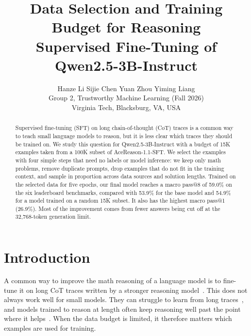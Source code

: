 \documentclass{article}
\title{Data Selection and Training Budget for Reasoning\\Supervised Fine-Tuning of Qwen2.5-3B-Instruct}
\author{%
  Hanze Li \quad Sijie Chen \quad Yuan Zhou \quad Yiming Liang \\
  Group 2, Trustworthy Machine Learning (Fall 2026) \\
  Virginia Tech, Blacksburg, VA, USA
}
\makeatletter
\newcommand{\passk}[1]{pass@#1}
\makeatother
\begin{document}
\maketitle

\begin{abstract}
Supervised fine-tuning (SFT) on long chain-of-thought (CoT) traces is a common way to teach small language models to reason,
but it is less clear which traces they should be trained on. We study this question for Qwen2.5-3B-Instruct with a budget of
15K examples taken from a 100K subset of AceReason-1.1-SFT. We select the examples with four simple steps that need no labels
or model inference: we keep only math problems, remove duplicate prompts, drop examples that do not fit in the training
context, and sample in proportion across data sources and solution lengths. Trained on the selected data for five epochs, our
final model reaches a macro \passk{8} of 59.0\% on the six leaderboard benchmarks, compared with 53.9\% for the base model and
54.9\% for a model trained on a random 15K subset. It also has the highest macro \passk{1} (26.9\%). Most of the improvement
comes from fewer answers being cut off at the 32,768-token generation limit.
\end{abstract}

\section{Introduction}

A common way to improve the math reasoning of a language model is to fine-tune it on long CoT traces written by a stronger
reasoning model~\citep{openthoughts,acereason11,s1}. This does not always work well for small models. They can struggle to
learn from long traces~\citep{li2025small}, and models trained to reason at length often keep reasoning well past the point
where it helps~\citep{chen2024overthinking}. When the data budget is limited, it therefore matters which examples are used for
training.
\end{document}
